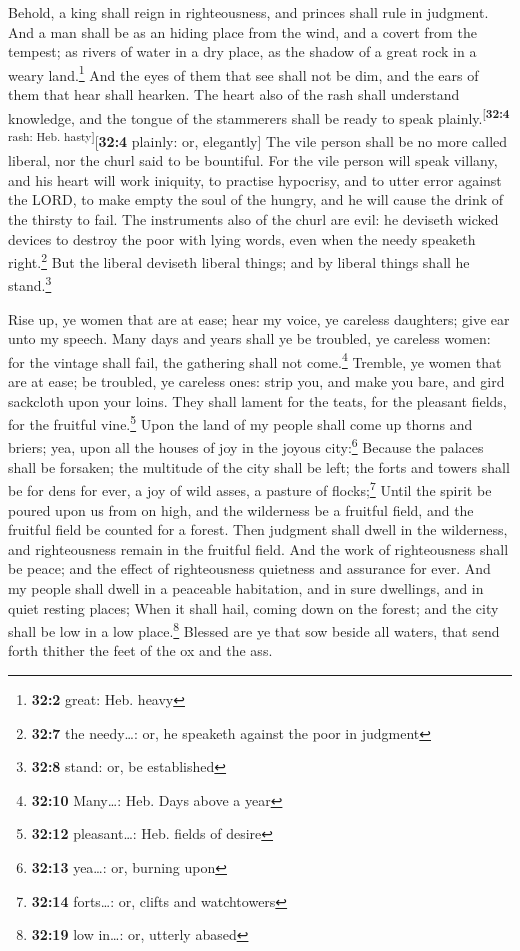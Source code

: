  Behold, a king shall reign in righteousness, and princes
shall rule in judgment.  And a man shall be as an hiding
place from the wind, and a covert from the tempest; as rivers of water
in a dry place, as the shadow of a great rock in a weary
land.\footnote{\textbf{32:2} great: Heb. heavy}  And the
eyes of them that see shall not be dim, and the ears of them that hear
shall hearken.  The heart also of the rash shall
understand knowledge, and the tongue of the stammerers shall be ready to
speak plainly.\textsuperscript{{[}\textbf{32:4} rash: Heb.
hasty{]}}{[}\textbf{32:4} plainly: or, elegantly{]}  The
vile person shall be no more called liberal, nor the churl said to be
bountiful.  For the vile person will speak villany, and
his heart will work iniquity, to practise hypocrisy, and to utter error
against the LORD, to make empty the soul of the hungry, and he will
cause the drink of the thirsty to fail.  The instruments
also of the churl are evil: he deviseth wicked devices to destroy the
poor with lying words, even when the needy speaketh right.\footnote{\textbf{32:7}
  the needy\ldots: or, he speaketh against the poor in judgment}
 But the liberal deviseth liberal things; and by liberal
things shall he stand.\footnote{\textbf{32:8} stand: or, be established}

 Rise up, ye women that are at ease; hear my voice, ye
careless daughters; give ear unto my speech.  Many days
and years shall ye be troubled, ye careless women: for the vintage shall
fail, the gathering shall not come.\footnote{\textbf{32:10} Many\ldots:
  Heb. Days above a year}  Tremble, ye women that are at
ease; be troubled, ye careless ones: strip you, and make you bare, and
gird sackcloth upon your loins.  They shall lament for
the teats, for the pleasant fields, for the fruitful vine.\footnote{\textbf{32:12}
  pleasant\ldots: Heb. fields of desire}  Upon the land
of my people shall come up thorns and briers; yea, upon all the houses
of joy in the joyous city:\footnote{\textbf{32:13} yea\ldots: or,
  burning upon}  Because the palaces shall be forsaken;
the multitude of the city shall be left; the forts and towers shall be
for dens for ever, a joy of wild asses, a pasture of flocks;\footnote{\textbf{32:14}
  forts\ldots: or, clifts and watchtowers}  Until the
spirit be poured upon us from on high, and the wilderness be a fruitful
field, and the fruitful field be counted for a forest. 
Then judgment shall dwell in the wilderness, and righteousness remain in
the fruitful field.  And the work of righteousness shall
be peace; and the effect of righteousness quietness and assurance for
ever.  And my people shall dwell in a peaceable
habitation, and in sure dwellings, and in quiet resting places;
 When it shall hail, coming down on the forest; and the
city shall be low in a low place.\footnote{\textbf{32:19} low in\ldots:
  or, utterly abased}  Blessed are ye that sow beside all
waters, that send forth thither the feet of the ox and the ass.

